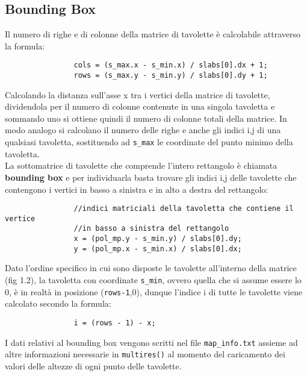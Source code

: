 		\subsection{Bounding Box}
			Il numero di righe e di colonne della matrice di tavolette \`{e} calcolabile attraverso la formula:
			\begin{verbatim}
				cols = (s_max.x - s_min.x) / slabs[0].dx + 1;
				rows = (s_max.y - s_min.y) / slabs[0].dy + 1;
			\end{verbatim} 
			Calcolando la distanza sull'asse x tra i vertici della matrice di tavolette, dividendola per il numero di colonne contenute in una singola tavoletta e sommando uno si ottiene quindi il numero di colonne totali della matrice. In modo analogo si calcolano il numero delle righe e anche gli indici i,j di una qualsiasi tavoletta, sostituendo ad \texttt{s\_max} le coordinate del punto minimo della tavoletta.\\
			La sottomatrice di tavolette che comprende l'intero rettangolo \`{e} chiamata \textbf{bounding box} e per individuarla basta trovare gli indici i,j delle tavolette che contengono i vertici in basso a sinistra e in alto a destra del rettangolo:
			\begin{verbatim}
				//indici matriciali della tavoletta che contiene il vertice 
				//in basso a sinistra del rettangolo
				x = (pol_mp.y - s_min.y) / slabs[0].dy;
				y = (pol_mp.x - s_min.x) / slabs[0].dx;
			\end{verbatim} 
			Dato l'ordine specifico in cui sono disposte le tavolette all'interno della matrice (fig 1.2), la tavoletta con coordinate \texttt{s\_min}, ovvero quella che si assume essere lo 0, \`{e} in realt\`{a} in posizione (\texttt{rows-1},0), dunque l'indice i di tutte le tavolette viene calcolato secondo la formula:
			\begin{verbatim}
				i = (rows - 1) - x;
			\end{verbatim} 
			I dati relativi al bounding box vengono scritti nel file \texttt{map\_info.txt} assieme ad altre informazioni necessarie in \texttt{multires()} al momento del caricamento dei valori delle altezze di ogni punto delle tavolette.

